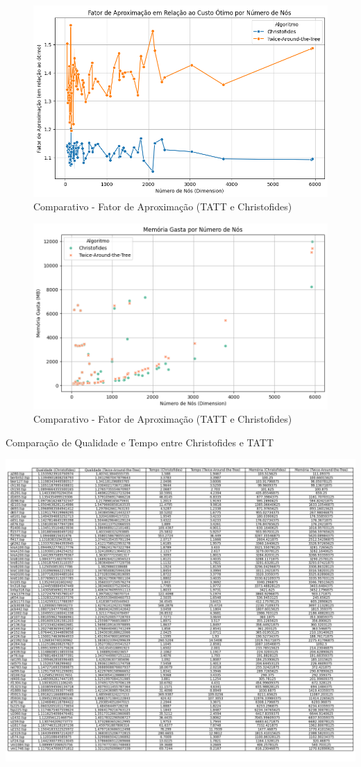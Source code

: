 \documentclass[12pt]{article}
\begin{document}
\begin{figure}[ht]
\centering
\includegraphics[width=.7\textwidth]{Figure4.png}
\caption{Comparativo - Fator de Aproximação (TATT e Christofides)}
\label{fig:exampleFig4}
\end{figure}

\begin{figure}[ht]
\centering
\includegraphics[width=.7\textwidth]{Figure5.png}
\caption{Comparativo - Fator de Aproximação (TATT e Christofides)}
\label{fig:exampleFig5}
\end{figure}


\begin{table}[ht]
\centering
\caption{Comparação de Qualidade e Tempo entre Christofides e TATT}
\label{tab:comparison}
\includegraphics[width=1.1\textwidth]{Tabela1.png}
\end{table}
\end{document}
